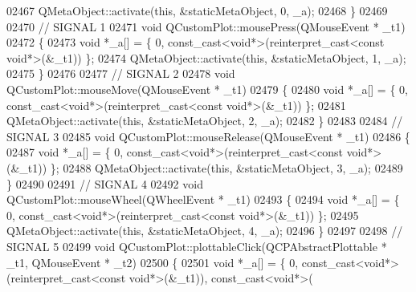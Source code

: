 \begin{DoxyCode}
02467     QMetaObject::activate(\textcolor{keyword}{this}, &staticMetaObject, 0, \_a);
02468 \}
02469 
02470 \textcolor{comment}{// SIGNAL 1}
02471 \textcolor{keywordtype}{void} QCustomPlot::mousePress(QMouseEvent * \_t1)
02472 \{
02473     \textcolor{keywordtype}{void} *\_a[] = \{ 0, \textcolor{keyword}{const\_cast<}\textcolor{keywordtype}{void}*\textcolor{keyword}{>}(\textcolor{keyword}{reinterpret\_cast<}\textcolor{keyword}{const }\textcolor{keywordtype}{void}*\textcolor{keyword}{>}(&\_t1)) \};
02474     QMetaObject::activate(\textcolor{keyword}{this}, &staticMetaObject, 1, \_a);
02475 \}
02476 
02477 \textcolor{comment}{// SIGNAL 2}
02478 \textcolor{keywordtype}{void} QCustomPlot::mouseMove(QMouseEvent * \_t1)
02479 \{
02480     \textcolor{keywordtype}{void} *\_a[] = \{ 0, \textcolor{keyword}{const\_cast<}\textcolor{keywordtype}{void}*\textcolor{keyword}{>}(\textcolor{keyword}{reinterpret\_cast<}\textcolor{keyword}{const }\textcolor{keywordtype}{void}*\textcolor{keyword}{>}(&\_t1)) \};
02481     QMetaObject::activate(\textcolor{keyword}{this}, &staticMetaObject, 2, \_a);
02482 \}
02483 
02484 \textcolor{comment}{// SIGNAL 3}
02485 \textcolor{keywordtype}{void} QCustomPlot::mouseRelease(QMouseEvent * \_t1)
02486 \{
02487     \textcolor{keywordtype}{void} *\_a[] = \{ 0, \textcolor{keyword}{const\_cast<}\textcolor{keywordtype}{void}*\textcolor{keyword}{>}(\textcolor{keyword}{reinterpret\_cast<}\textcolor{keyword}{const }\textcolor{keywordtype}{void}*\textcolor{keyword}{>}(&\_t1)) \};
02488     QMetaObject::activate(\textcolor{keyword}{this}, &staticMetaObject, 3, \_a);
02489 \}
02490 
02491 \textcolor{comment}{// SIGNAL 4}
02492 \textcolor{keywordtype}{void} QCustomPlot::mouseWheel(QWheelEvent * \_t1)
02493 \{
02494     \textcolor{keywordtype}{void} *\_a[] = \{ 0, \textcolor{keyword}{const\_cast<}\textcolor{keywordtype}{void}*\textcolor{keyword}{>}(\textcolor{keyword}{reinterpret\_cast<}\textcolor{keyword}{const }\textcolor{keywordtype}{void}*\textcolor{keyword}{>}(&\_t1)) \};
02495     QMetaObject::activate(\textcolor{keyword}{this}, &staticMetaObject, 4, \_a);
02496 \}
02497 
02498 \textcolor{comment}{// SIGNAL 5}
02499 \textcolor{keywordtype}{void} QCustomPlot::plottableClick(QCPAbstractPlottable * \_t1, QMouseEvent * \_t2)
02500 \{
02501     \textcolor{keywordtype}{void} *\_a[] = \{ 0, \textcolor{keyword}{const\_cast<}\textcolor{keywordtype}{void}*\textcolor{keyword}{>}(\textcolor{keyword}{reinterpret\_cast<}\textcolor{keyword}{const }\textcolor{keywordtype}{void}*\textcolor{keyword}{>}(&\_t1)), \textcolor{keyword}{const\_cast<}\textcolor{keywordtype}{void}*\textcolor{keyword}{>}(\textcolor{keyword}{
}
\end{DoxyCode}
